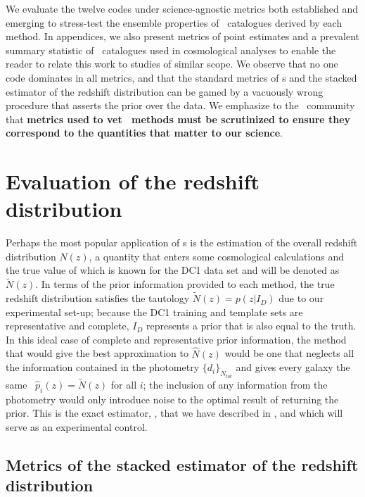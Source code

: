 We evaluate the twelve codes under science-agnostic metrics both established and emerging to stress-test the ensemble properties of \pzpdf\ catalogues derived by each method.
In appendices, we also present metrics of point estimates and a prevalent summary statistic of \pzpdf\ catalogues used in cosmological analyses to enable the reader to relate this work to studies of similar scope.
We observe that no one code dominates in all metrics, and that the standard metrics of \pzpdf s and the stacked estimator of the redshift distribution can be gamed by a vacuously wrong procedure that asserts the prior over the data.
We emphasize to the \pz\ community that \textbf{metrics used to vet \pzpdf\ methods must be scrutinized to ensure they correspond to the quantities that matter to our science}.

\section{Evaluation of the redshift distribution}

Perhaps the most popular application of \pzpdf s is the estimation of the overall redshift distribution $N(z)$, a quantity that enters some cosmological calculations and the true value of which is known for the DC1 data set and will be denoted as $\tilde{N}(z)$.
In terms of the prior information provided to each method, the true redshift distribution satisfies the tautology $\tilde{N}(z) = p(z \vert I_{D})$ due to our experimental set-up; because the DC1 training and template sets are representative and complete, $I_{D}$ represents a prior that is also equal to the truth.
In this ideal case of complete and representative prior information, the method that would give the best approximation to $\hat{N}(z)$ would be one that neglects all the information contained in the photometry $\{d_{i}\}_{N_{tot}}$ and gives every galaxy the same \pzpdf\ $\hat{p}_{i}(z) = \tilde{N}(z)$ for all $i$; the inclusion of any information from the photometry would only introduce noise to the optimal result of returning the prior.
This is the exact estimator, \trainz, that we have described in , and which will serve as an experimental control.

\subsection{Metrics of the stacked estimator of the redshift distribution}
\label{sec:stackedmetrics}


